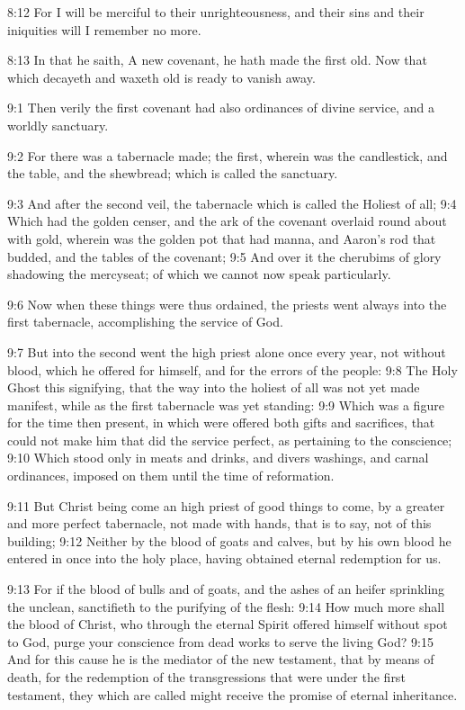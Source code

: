 8:12 For I will be merciful to their unrighteousness, and their sins
and their iniquities will I remember no more.

8:13 In that he saith, A new covenant, he hath made the first old. Now
that which decayeth and waxeth old is ready to vanish away.

9:1 Then verily the first covenant had also ordinances of divine
service, and a worldly sanctuary.

9:2 For there was a tabernacle made; the first, wherein was the
candlestick, and the table, and the shewbread; which is called the
sanctuary.

9:3 And after the second veil, the tabernacle which is called the
Holiest of all; 9:4 Which had the golden censer, and the ark of the
covenant overlaid round about with gold, wherein was the golden pot
that had manna, and Aaron's rod that budded, and the tables of the
covenant; 9:5 And over it the cherubims of glory shadowing the
mercyseat; of which we cannot now speak particularly.

9:6 Now when these things were thus ordained, the priests went always
into the first tabernacle, accomplishing the service of God.

9:7 But into the second went the high priest alone once every year,
not without blood, which he offered for himself, and for the errors of
the people: 9:8 The Holy Ghost this signifying, that the way into the
holiest of all was not yet made manifest, while as the first
tabernacle was yet standing: 9:9 Which was a figure for the time then
present, in which were offered both gifts and sacrifices, that could
not make him that did the service perfect, as pertaining to the
conscience; 9:10 Which stood only in meats and drinks, and divers
washings, and carnal ordinances, imposed on them until the time of
reformation.

9:11 But Christ being come an high priest of good things to come, by a
greater and more perfect tabernacle, not made with hands, that is to
say, not of this building; 9:12 Neither by the blood of goats and
calves, but by his own blood he entered in once into the holy place,
having obtained eternal redemption for us.

9:13 For if the blood of bulls and of goats, and the ashes of an
heifer sprinkling the unclean, sanctifieth to the purifying of the
flesh: 9:14 How much more shall the blood of Christ, who through the
eternal Spirit offered himself without spot to God, purge your
conscience from dead works to serve the living God?  9:15 And for this
cause he is the mediator of the new testament, that by means of death,
for the redemption of the transgressions that were under the first
testament, they which are called might receive the promise of eternal
inheritance.

